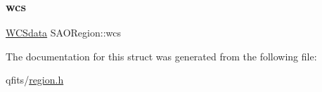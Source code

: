 \mbox{\label{struct_s_a_o_region_aaf9319ad8adb55abc895cac9ea743fad}} 
\subsubsection{\texorpdfstring{wcs}{wcs}}
{\footnotesize\ttfamily \hyperlink{struct_w_c_sdata}{W\+C\+Sdata} S\+A\+O\+Region\+::wcs}



The documentation for this struct was generated from the following file\+:\begin{DoxyCompactItemize}
\item 
qfits/\hyperlink{region_8h}{region.\+h}\end{DoxyCompactItemize}
